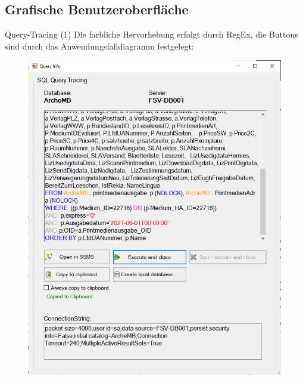 \documentclass[toc]{beamer}
\begin{document}
    \subsection{Grafische Benutzeroberfläche}
        \begin{frame}{Query-Tracing (1)}
        Die farbliche Hervorhebung erfolgt durch RegEx, die Buttons sind durch das Anwendungsfalldiagramm festgelegt:
            \begin{figure}[htp]
                \includegraphics[scale=0.45]{gui.png}
            \end{figure}
        \end{frame}
        
\end{document}
